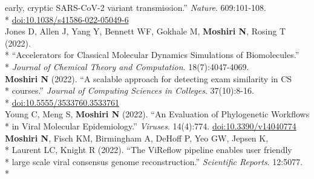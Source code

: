 \documentclass[margin,line]{res}
\begin{document}
\begin{resume}
\hspace*{9mm} early, cryptic SARS-CoV-2 variant transmission.'' \textit{Nature}. 609:101-108.\\*\vspace{2mm}
\hspace*{8mm} \href{https://doi.org/10.1038/s41586-022-05049-6}{doi:10.1038/s41586-022-05049-6}\\
\hspace*{4mm} Jones D, Allen J, Yang Y, Bennett WF, Gokhale M, \textbf{Moshiri N}, Rosing T (2022).\\*
\hspace*{9mm} ``Accelerators for Classical Molecular Dynamics Simulations of Biomolecules.''\\*\vspace{2mm}
\hspace*{8mm} \textit{Journal of Chemical Theory and Computation}. 18(7):4047-4069.\\
\hspace*{4mm} \textbf{Moshiri N} (2022). ``A scalable approach for detecting exam similarity in CS\\*
\hspace*{9mm} courses.'' \textit{Journal of Computing Sciences in Colleges}. 37(10):8-16.\\*\vspace{2mm}
\hspace*{8mm} \href{https://dl.acm.org/doi/abs/10.5555/3533760.3533761}{doi:10.5555/3533760.3533761}\\
\hspace*{4mm} Young C, Meng S, \textbf{Moshiri N} (2022). ``An Evaluation of Phylogenetic Workflows\\*\vspace{2mm}
\hspace*{8mm} in Viral Molecular Epidemiology.'' \textit{Viruses}. 14(4):774. \href{https://doi.org/10.3390/v14040774}{doi:10.3390/v14040774}\\
\hspace*{4mm} \textbf{Moshiri N}, Fisch KM, Birmingham A, DeHoff P, Yeo GW, Jepsen K,\\*
\hspace*{9mm} Laurent LC, Knight R (2022). ``The ViReflow pipeline enables user friendly\\*
\hspace*{9mm} large scale viral consensus genome reconstruction.'' \textit{Scientific Reports}. 12:5077.\\*\vspace{2mm}

\end{resume}
\end{document}
